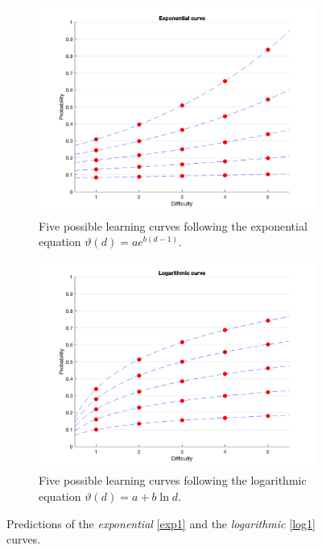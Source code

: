 \documentclass{article}
\newcommand{\0}{\mathbbold{0}}
\newcommand{\1}{\mathds{1}}
\newcommand{\2}{\mathbbold{2}}
\begin{document}
\begin{figure}[ht!]
    \centering
    \begin{subfigure}[b]{0.4\linewidth}
        \includegraphics[width=\linewidth]{exp.png}
        \caption{Five possible learning curves following the exponential equation $\vartheta(d) = ae^{b(d-1)}$.}
        \label{exp1}
    \end{subfigure}\hspace{0.05\linewidth}
    \begin{subfigure}[b]{0.4\linewidth}
        \includegraphics[width=\linewidth]{log.png}
        \caption{Five possible learning curves following the logarithmic equation $\vartheta(d) = a + b\ln d$.}
        \label{log1}
    \end{subfigure}
    \caption{Predictions of the \textsl{exponential} \eqref{exp1} and the \textsl{logarithmic} \eqref{log1} curves.}
    \label{fig1}
\end{figure}
\end{document}
